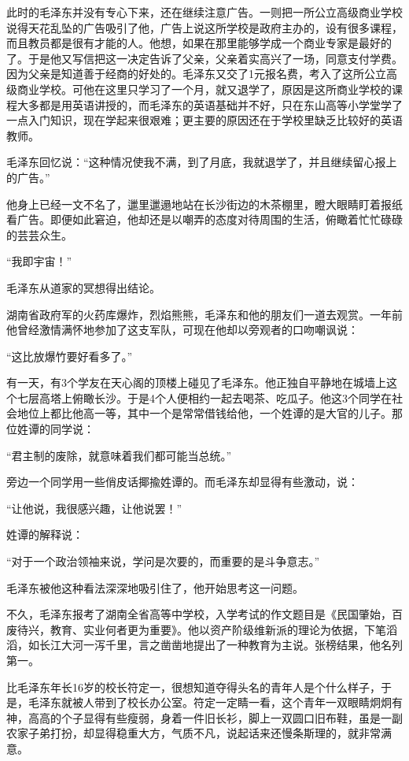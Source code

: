 \documentclass[../../dazhuan.tex]{subfiles}
\begin{document}
此时的毛泽东并没有专心下来，还在继续注意广告。一则把一所公立高级商业学校说得天花乱坠的广告吸引了他，广告上说这所学校是政府主办的，设有很多课程，而且教员都是很有才能的人。他想，如果在那里能够学成一个商业专家是最好的了。于是他又写信把这一决定告诉了父亲，父亲着实高兴了一场，同意支付学费。因为父亲是知道善于经商的好处的。毛泽东又交了1元报名费，考入了这所公立高级商业学校。可他在这里只学习了一个月，就又退学了，原因是这所商业学校的课程大多都是用英语讲授的，而毛泽东的英语基础并不好，只在东山高等小学堂学了一点入门知识，现在学起来很艰难；更主要的原因还在于学校里缺乏比较好的英语教师。

毛泽东回忆说：“这种情况使我不满，到了月底，我就退学了，并且继续留心报上的广告。”

他身上已经一文不名了，邋里邋遢地站在长沙街边的木茶棚里，瞪大眼睛盯着报纸看广告。即便如此窘迫，他却还是以嘲弄的态度对待周围的生活，俯瞰着忙忙碌碌的芸芸众生。

“我即宇宙！”

毛泽东从道家的冥想得出结论。

湖南省政府军的火药库爆炸，烈焰熊熊，毛泽东和他的朋友们一道去观赏。一年前他曾经激情满怀地参加了这支军队，可现在他却以旁观者的口吻嘲讽说：

“这比放爆竹要好看多了。”

有一天，有3个学友在天心阁的顶楼上碰见了毛泽东。他正独自平静地在城墙上这个七层高塔上俯瞰长沙。于是4个人便相约一起去喝茶、吃瓜子。他这3个同学在社会地位上都比他高一等，其中一个是常常借钱给他，一个姓谭的是大官的儿子。那位姓谭的同学说：

“君主制的废除，就意味着我们都可能当总统。”

旁边一个同学用一些俏皮话揶揄姓谭的。而毛泽东却显得有些激动，说：

“让他说，我很感兴趣，让他说罢！”

姓谭的解释说：

“对于一个政治领袖来说，学问是次要的，而重要的是斗争意志。”

毛泽东被他这种看法深深地吸引住了，他开始思考这一问题。

不久，毛泽东报考了湖南全省高等中学校，入学考试的作文题目是《民国肇始，百废待兴，教育、实业何者更为重要》。他以资产阶级维新派的理论为依据，下笔滔滔，如长江大河一泻千里，言之凿凿地提出了一种教育为主说。张榜结果，他名列第一。

比毛泽东年长16岁的校长符定一，很想知道夺得头名的青年人是个什么样子，于是，毛泽东就被人带到了校长办公室。符定一定睛一看，这个青年一双眼睛炯炯有神，高高的个子显得有些瘦弱，身着一件旧长衫，脚上一双圆口旧布鞋，虽是一副农家子弟打扮，却显得稳重大方，气质不凡，说起话来还慢条斯理的，就非常满意。
\end{document}
